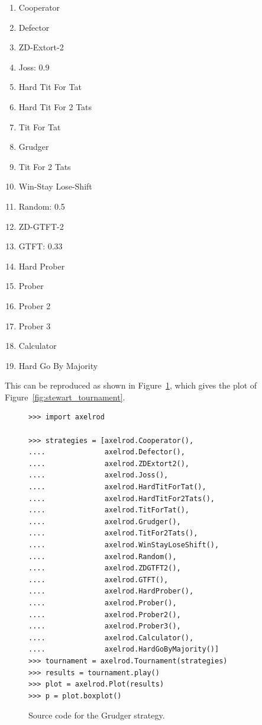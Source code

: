 \documentclass{article}
\begin{document}
\begin{enumerate}
    \item Cooperator
    \item Defector
    \item ZD-Extort-2
    \item Joss: 0.9
    \item Hard Tit For Tat
    \item Hard Tit For 2 Tats
    \item Tit For Tat
    \item Grudger
    \item Tit For 2 Tats
    \item Win-Stay Lose-Shift
    \item Random: 0.5
    \item ZD-GTFT-2
    \item GTFT: 0.33
    \item Hard Prober
    \item Prober
    \item Prober 2
    \item Prober 3
    \item Calculator
    \item Hard Go By Majority
\end{enumerate}

This can be reproduced as shown in Figure~\ref{fig:stewart-code}, which gives
the plot of Figure~\ref{fig:stewart_tournament}.

\begin{figure}[!hbtp]
    \begin{verbatim}
>>> import axelrod

>>> strategies = [axelrod.Cooperator(),
....              axelrod.Defector(),
....              axelrod.ZDExtort2(),
....              axelrod.Joss(),
....              axelrod.HardTitForTat(),
....              axelrod.HardTitFor2Tats(),
....              axelrod.TitForTat(),
....              axelrod.Grudger(),
....              axelrod.TitFor2Tats(),
....              axelrod.WinStayLoseShift(),
....              axelrod.Random(),
....              axelrod.ZDGTFT2(),
....              axelrod.GTFT(),
....              axelrod.HardProber(),
....              axelrod.Prober(),
....              axelrod.Prober2(),
....              axelrod.Prober3(),
....              axelrod.Calculator(),
....              axelrod.HardGoByMajority()]
>>> tournament = axelrod.Tournament(strategies)
>>> results = tournament.play()
>>> plot = axelrod.Plot(results)
>>> p = plot.boxplot()
    \end{verbatim}
    \caption{Source code for the Grudger strategy.}
    \label{fig:stewart-code}
\end{figure}
\end{document}
